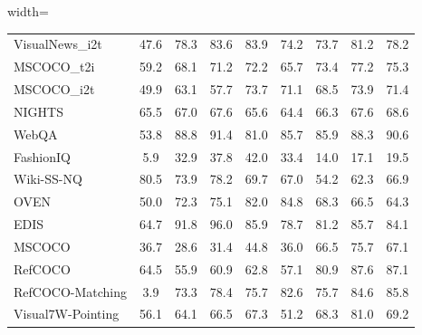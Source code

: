 \begin{table}[!ht]
\begin{adjustbox}{width=\textwidth}
\begin{tabular}{l|cccccccc}
        VisualNews\_i2t & 47.6 & 78.3 & 83.6 & 83.9 & 74.2 & 73.7 & 81.2 & 78.2 \\ 
        MSCOCO\_t2i & 59.2 & 68.1 & 71.2 & 72.2 & 65.7 & 73.4 & 77.2 & 75.3 \\ 
        MSCOCO\_i2t & 49.9 & 63.1 & 57.7 & 73.7 & 71.1 & 68.5 & 73.9 & 71.4 \\ 
        NIGHTS & 65.5 & 67.0 & 67.6 & 65.6 & 64.4 & 66.3 & 67.6 & 68.6 \\ 
        WebQA & 53.8 & 88.8 & 91.4 & 81.0 & 85.7 & 85.9 & 88.3 & 90.6 \\ 
        FashionIQ & 5.9 & 32.9 & 37.8 & 42.0 & 33.4 & 14.0 & 17.1 & 19.5 \\ 
        Wiki-SS-NQ & 80.5 & 73.9 & 78.2 & 69.7 & 67.0 & 54.2 & 62.3 & 66.9 \\ 
        OVEN & 50.0 & 72.3 & 75.1 & 82.0 & 84.8 & 68.3 & 66.5 & 64.3 \\ 
        EDIS & 64.7 & 91.8 & 96.0 & 85.9 & 78.7 & 81.2 & 85.7 & 84.1 \\ 
        MSCOCO & 36.7 & 28.6 & 31.4 & 44.8 & 36.0 & 66.5 & 75.7 & 67.1 \\ 
        RefCOCO & 64.5 & 55.9 & 60.9 & 62.8 & 57.1 & 80.9 & 87.6 & 87.1 \\ 
        RefCOCO-Matching & 3.9 & 73.3 & 78.4 & 75.7 & 82.6 & 75.7 & 84.6 & 85.8 \\ 
        Visual7W-Pointing & 56.1 & 64.1 & 66.5 & 67.3 & 51.2 & 68.3 & 81.0 & 69.2 \\ 
        \midrule
        

\end{tabular}
\end{adjustbox}
\end{table}
